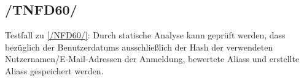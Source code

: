 \subsection*{/TNFD60/}
\label{/NFD60/} Testfall zu \ref{/NFD60/}: Durch \gls{statische Analyse} kann geprüft werden, dass bezüglich der \Glspl{Benutzerdatum} ausschließlich der \Gls{Hash} der verwendeten Nutzernamen/E-Mail-Adressen der Anmeldung, bewertete \Glspl{Alias} und erstellte \Glspl{Alias} gespeichert werden.